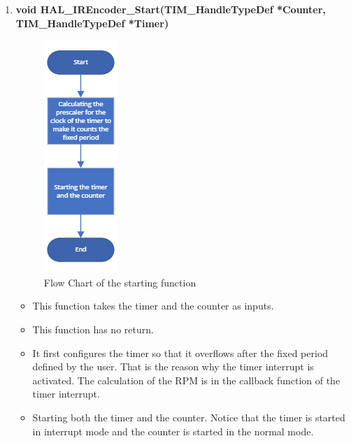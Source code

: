 \begin{enumerate}
    \item \textbf{void HAL\_IREncoder\_Start(TIM\_HandleTypeDef *Counter,\\TIM\_HandleTypeDef *Timer)}
    \begin{figure}[h]
        \centering
        \includegraphics[scale=.6]{figuresEncoder/11.png}
        \caption{Flow Chart of the starting function}
    \end{figure}
    \begin{itemize}
        \item This function takes the timer and the counter as inputs.
        \item This function has no return.
        \item It first configures the timer so that it overflows after the fixed period defined by the user. That is the reason why the timer interrupt is activated. The calculation of the RPM is in the callback function of the timer interrupt.
        \item Starting both the timer and the counter. Notice that the timer is started in interrupt mode and the counter is started in the normal mode.
    \end{itemize}
    

\end{enumerate}
